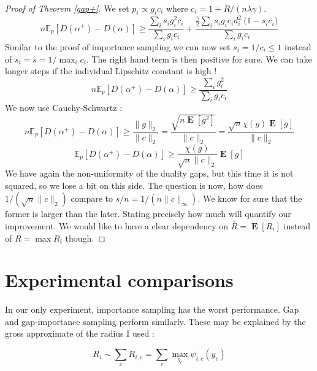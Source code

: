 \documentclass{article}
\DeclareMathOperator{\1}{\mathbb{1}}
\DeclareMathOperator{\E}{\mathbf{E}}
\begin{document}
\begin{proof}[Proof of Theorem \ref{gap+}]
	We set $p_i \propto g_i c_i$ where $c_i = 1+ R/(n \lambda \gamma)$. 
	\begin{equation}
		n \mathbb E_p[D(\alpha^+) - D(\alpha)] 
		\geq \frac{ \sum_i s_i g_i^2 c_i}{\sum_i g_i c_i}  
		+ \frac{ \frac{\gamma}{2}  \sum_i s_i  g_i c_i d_i^2 \ 
		\big ( 1 - s_i c_i \big) }{\sum_i g_i c_i}
	\end{equation}
	Similar to the proof of importance sampling we can now set $s_i= 1/c_i \leq 1$ instead of $s_i=s=1/\max_i c_i$.
	The right hand term is then positive for sure.
	We can take longer steps if the individual Lipschitz constant is high !
	\begin{equation}
		n \mathbb E_p[D(\alpha^+) - D(\alpha)] 
		\geq \frac{ \sum_i g_i^2 }{\sum_i g_i c_i}  
	\end{equation}
	We now use Cauchy-Schwartz :
	 \begin{equation}
		n \mathbb E_p[D(\alpha^+) - D(\alpha)] 
		\geq \frac{ \|g\|_2 }{\|c\|_2} = \frac{ \sqrt{n \E [g^2] } }{\|c\|_2} = \frac{ \sqrt{n} \chi(g) \E [g]}{\|c\|_2}
	\end{equation}
	\begin{equation}
		\mathbb E_p[D(\alpha^+) - D(\alpha)] 
		\geq \frac{ \chi(g) }{ \sqrt{n} \|c\|_2} \E [g]
	\end{equation}
	We have again the non-uniformity of the duality gaps, but this time it is not squared, so we lose a bit on this side.
	The question is now, how does $1/(\sqrt n \|c\|_2)$ compare to $s/n = 1/(n \|c\|_\infty) $.
	We know for sure that the former is larger than the later.
	Stating precisely how much will quantify our improvement.
	We would like to have a clear dependency on $\bar R = \E[R_i]$ instead of $R=\max R_i$ though.
\end{proof}

\section{Experimental comparisons}

In our only experiment, importance sampling has the worst performance. 
Gap and gap-importance sampling perform similarly. 
These may be explained by the gross approximate of the radius I used :

\begin{equation}
	R_i \sim \sum_c R_{i,c} = \sum_c \max_{y_c} \psi_{i,c}(y_c)
\end{equation}
\end{document}
